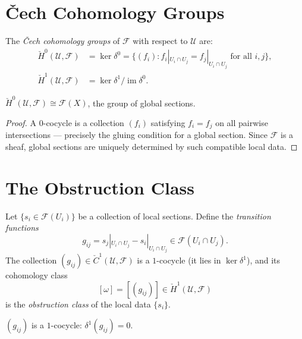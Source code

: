 \documentclass[11pt,openany]{book}
\begin{document}
\section{Čech Cohomology Groups}
\label{sec:cohomology-groups}

\begin{definition}
The \emph{Čech cohomology groups} of $\mathcal{F}$ with
respect to $\mathcal{U}$ are:
\begin{align*}
  \check{H}^0(\mathcal{U}, \mathcal{F})
    &= \ker \delta^0
     = \{(f_i) : f_i|_{U_i \cap U_j} = f_j|_{U_i \cap U_j}
       \text{ for all } i,j\}, \\
  \check{H}^1(\mathcal{U}, \mathcal{F})
    &= \ker \delta^1 / \operatorname{im} \delta^0.
\end{align*}
\end{definition}

\begin{proposition}
\label{prop:global-sections}
$\check{H}^0(\mathcal{U}, \mathcal{F}) \cong
\mathcal{F}(X)$, the group of global sections.
\end{proposition}

\begin{proof}
A $0$-cocycle is a collection $(f_i)$ satisfying $f_i =
f_j$ on all pairwise intersections — precisely the gluing
condition for a global section.  Since $\mathcal{F}$ is a
sheaf, global sections are uniquely determined by such
compatible local data.
\end{proof}

\section{The Obstruction Class}
\label{sec:obstruction-class}

\begin{definition}
\label{def:obstruction-class}
Let $\{s_i \in \mathcal{F}(U_i)\}$ be a collection of
local sections.  Define the \emph{transition functions}
\[
  g_{ij} = s_j|_{U_i \cap U_j} - s_i|_{U_i \cap U_j}
  \in \mathcal{F}(U_i \cap U_j).
\]
The collection $(g_{ij}) \in \check{C}^1(\mathcal{U},
\mathcal{F})$ is a $1$-cocycle (it lies in $\ker \delta^1$),
and its cohomology class
\[
  [\omega] = [(g_{ij})] \in \check{H}^1(\mathcal{U},
  \mathcal{F})
\]
is the \emph{obstruction class} of the local data
$\{s_i\}$.
\end{definition}

\begin{proposition}
\label{prop:cocycle-condition}
$(g_{ij})$ is a $1$-cocycle: $\delta^1(g_{ij}) = 0$.
\end{proposition}
\end{document}
